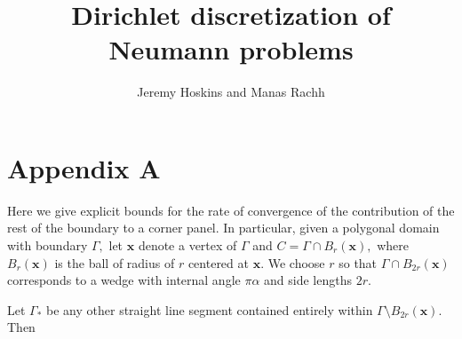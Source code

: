 \documentclass[12pt]{article}
\newcommand{\bx}{\boldsymbol{x}}
\begin{document}
 \title{Dirichlet discretization of Neumann problems}
 \author{Jeremy Hoskins and Manas Rachh}
 \maketitle









\section*{Appendix A}
Here we give explicit bounds for the rate of convergence of the contribution of the rest of the boundary to a corner panel. In particular, given a polygonal domain with boundary $\Gamma,$ let $\bx$ denote a vertex of $\Gamma$ and $C = \Gamma \cap B_r(\bx),$ where $B_r(\bx)$ is the ball of radius of $r$ centered at $\bx.$ We choose $r$ so that $\Gamma \cap B_{2r}(\bx)$ corresponds to a wedge with internal angle $\pi \alpha$ and side lengths $2r.$ 

Let $\Gamma_*$ be any other straight line segment contained entirely within $\Gamma \setminus B_{2r}(\bx).$ Then
\end{document}
